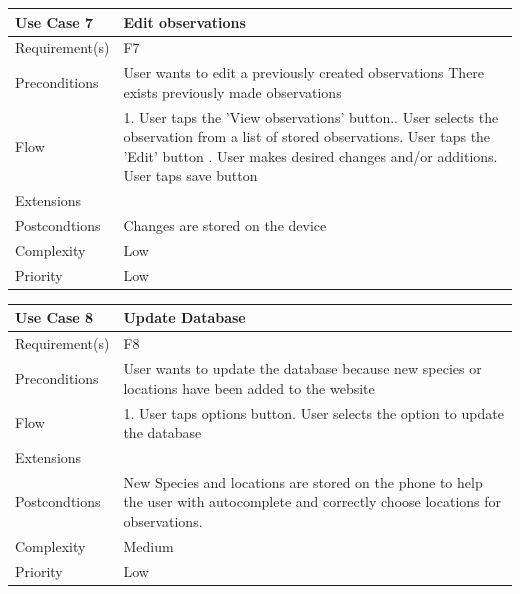 \begin{tabular}[t]{|l|p{}|}\hline
	Use Case 7&Edit observations\\\hline
	Requirement(s)&F7\\\hline
	Preconditions&User wants to edit a previously created observations\newline
	There exists previously made observations\\\hline
	Flow&1. User taps the 'View observations' button.\newline
	2. User selects the observation from a list of stored observations\newline
	3. User taps the 'Edit' button \newline
	4. User makes desired changes and/or additions\newline
	5. User taps save button\\\hline
	Extensions& \\\hline
	Postcondtions&Changes are stored on the device\\\hline
	Complexity&Low\\\hline
	Priority&Low\\\hline
\end{tabular}

\hspace{2em}

\begin{tabular}[t]{|l|p{}|}\hline
	Use Case 8&Update Database\\\hline
	Requirement(s)&F8\\\hline
	Preconditions&User wants to update the database because new species or
	locations have been added to the website\\\hline
	Flow&1. User taps options button\newline
	2. User selects the option to update the database\\\hline
	Extensions& \\\hline
	Postcondtions&New Species and locations are stored on the phone to help
	the user with autocomplete and correctly choose locations for observations.\\\hline
	Complexity&Medium\\\hline
	Priority&Low\\\hline
\end{tabular}
